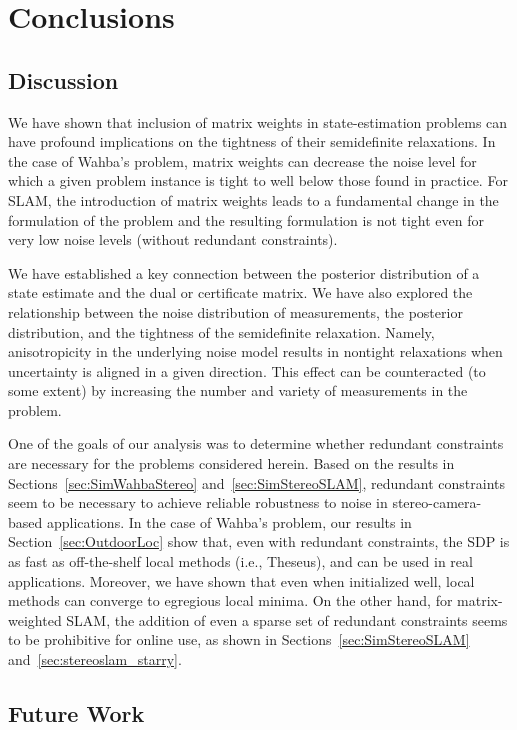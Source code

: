 \documentclass[lettersize,journal]{IEEEtran}
\begin{document}
\section{Conclusions}\label{sec:Conclusions}
\subsection{Discussion}
We have shown that inclusion of matrix weights in state-estimation problems can have profound implications on the tightness of their semidefinite relaxations. In the case of Wahba's problem, matrix weights can decrease the noise level for which a given problem instance is tight to well below those found in practice. For SLAM, the introduction of matrix weights leads to a fundamental change in the formulation of the problem and the resulting formulation is not tight even for very low noise levels (without redundant constraints). 

We have established a key connection between the posterior distribution of a state estimate and the dual or certificate matrix. We have also explored the relationship between the noise distribution of measurements, the posterior distribution, and the tightness of the semidefinite relaxation. Namely, anisotropicity in the underlying noise model results in nontight relaxations when uncertainty is aligned in a given direction. This effect can be counteracted (to some extent) by increasing the number and variety of measurements in the problem.

One of the goals of our analysis was to determine whether redundant constraints are necessary for the problems considered herein. Based on the results in Sections~\ref{sec:SimWahbaStereo} and~\ref{sec:SimStereoSLAM}, redundant constraints seem to be necessary to achieve reliable robustness to noise in stereo-camera-based applications. In the case of Wahba's problem, our results in Section~\ref{sec:OutdoorLoc} show that, even with redundant constraints, the SDP is as fast as off-the-shelf local methods (i.e., Theseus), and can be used in real applications. Moreover, we have shown that even when initialized well, local methods can converge to egregious local minima. On the other hand, for matrix-weighted SLAM, the addition of even a sparse set of redundant constraints seems to be prohibitive for online use, as shown in Sections~\ref{sec:SimStereoSLAM} and~\ref{sec:stereoslam_starry}.

\subsection{Future Work}\label{sec:Future}
\end{document}
